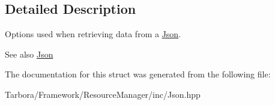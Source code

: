 \subsection{Detailed Description}
Options used when retrieving data from a \hyperlink{classTarbora_1_1Json}{Json}. \begin{DoxySeeAlso}{See also}
\hyperlink{classTarbora_1_1Json}{Json} 
\end{DoxySeeAlso}


The documentation for this struct was generated from the following file\+:\begin{DoxyCompactItemize}
\item 
Tarbora/\+Framework/\+Resource\+Manager/inc/Json.\+hpp\end{DoxyCompactItemize}
